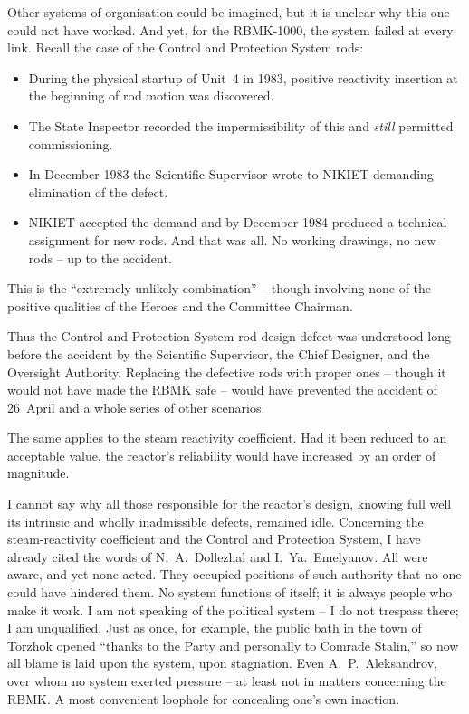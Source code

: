 \documentclass[openright]{bookest}
\begin{document}
Other systems of organisation could be imagined, but it is unclear why this one could not have worked. And yet, for the RBMK-1000, the system failed at every link. Recall the case of the Control and Protection System rods:

\begin{itemize}
\item During the physical startup of Unit~4 in 1983, positive reactivity insertion at the beginning of rod motion was discovered.
\item The State Inspector recorded the impermissibility of this and \textit{still} permitted commissioning.
\item In December 1983 the Scientific Supervisor wrote to NIKIET demanding elimination of the defect.
\item NIKIET accepted the demand and by December 1984 produced a technical assignment for new rods. And that was all. No working drawings, no new rods -- up to the accident.
\end{itemize}

This is the ``extremely unlikely combination'' -- though involving none of the positive qualities of the Heroes and the Committee Chairman.

Thus the Control and Protection System rod design defect was understood long before the accident by the Scientific Supervisor, the Chief Designer, and the Oversight Authority. Replacing the defective rods with proper ones -- though it would not have made the RBMK safe -- would have prevented the accident of 26~April and a whole series of other scenarios.

The same applies to the steam reactivity coefficient. Had it been reduced to an acceptable value, the reactor's reliability would have increased by an order of magnitude.

I cannot say why all those responsible for the reactor's design, knowing full well its intrinsic and wholly inadmissible defects, remained idle. Concerning the steam-reactivity coefficient and the Control and Protection System, I have already cited the words of N.~A.~Dollezhal and I.~Ya.~Emelyanov. All were aware, and yet none acted. They occupied positions of such authority that no one could have hindered them. No system functions of itself; it is always people who make it work. I am not speaking of the political system -- I do not trespass there; I am unqualified. Just as once, for example, the public bath in the town of Torzhok opened ``thanks to the Party and personally to Comrade Stalin,'' so now all blame is laid upon the system, upon stagnation. Even A.~P.~Aleksandrov, over whom no system exerted pressure -- at least not in matters concerning the RBMK. A most convenient loophole for concealing one's own inaction.
\end{document}
